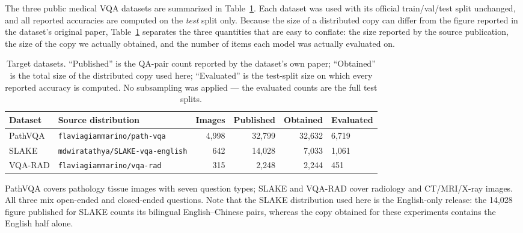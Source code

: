 The three public medical VQA datasets are summarized in
Table~\ref{tab:datasets}. Each dataset was used with its official
train/val/test split unchanged, and all reported accuracies are computed on the
\emph{test} split only. Because the size of a distributed copy can differ from
the figure reported in the dataset's original paper, Table~\ref{tab:datasets}
separates the three quantities that are easy to conflate: the size reported by
the source publication, the size of the copy we actually obtained, and the
number of items each model was actually evaluated on.

\begin{table}[t]
\centering
\caption{Target datasets. ``Published'' is the QA-pair count reported by the
dataset's own paper; ``Obtained'' is the total size of the distributed copy used
here; ``Evaluated'' is the test-split size on which every reported accuracy is
computed. No subsampling was applied --- the evaluated counts are the full test
splits.}
\label{tab:datasets}
\small
\begin{tabular}{@{}llrrrl@{}}
\toprule
Dataset & Source distribution & Images & Published & Obtained & Evaluated \\
\midrule
PathVQA & \texttt{flaviagiammarino/path-vqa}      & 4,998 & 32,799 & 32,632 & 6,719 \\
SLAKE   & \texttt{mdwiratathya/SLAKE-vqa-english} & 642   & 14,028 & 7,033  & 1,061 \\
VQA-RAD & \texttt{flaviagiammarino/vqa-rad}       & 315   & 2,248  & 2,244  & 451 \\
\bottomrule
\end{tabular}
\end{table}

PathVQA covers pathology tissue images with seven question types; SLAKE and
VQA-RAD cover radiology and CT/MRI/X-ray images. All three mix open-ended and
closed-ended questions. Note that the SLAKE distribution used here is the
English-only release: the 14,028 figure published for SLAKE counts its bilingual
English--Chinese pairs, whereas the copy obtained for these experiments contains
the English half alone.

